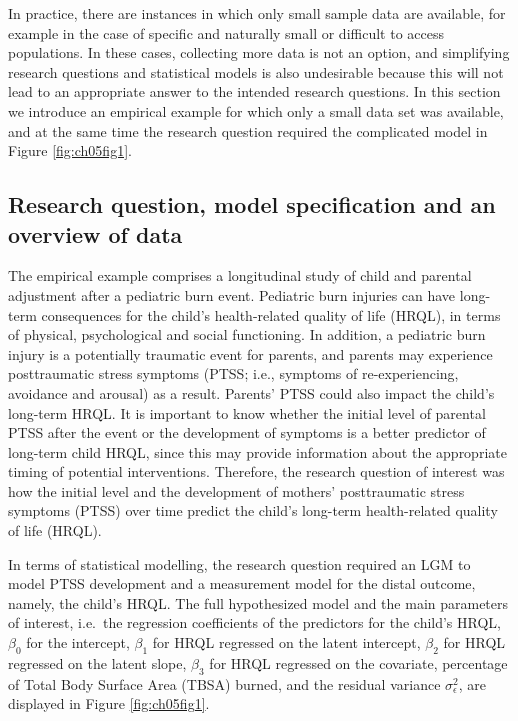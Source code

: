 \documentclass[openright,titlepage,12pt,a4paper]{book}
\begin{document}
In practice, there are instances in which only small sample data are available, for example in the case of specific and naturally small or difficult to access populations. In these cases, collecting more data is not an option, and simplifying research questions and statistical models is also undesirable because this will not lead to an appropriate answer to the intended research questions. In this section we introduce an empirical example for which only a small data set was available, and at the same time the research question required the complicated model in Figure \ref{fig:ch05fig1}.

\hypertarget{research-question-model-specification-and-an-overview-of-data}{%
\subsection{Research question, model specification and an overview of data}\label{research-question-model-specification-and-an-overview-of-data}}

The empirical example comprises a longitudinal study of child and parental adjustment after a pediatric burn event. Pediatric burn injuries can have long-term consequences for the child's health-related quality of life (HRQL), in terms of physical, psychological and social functioning. In addition, a pediatric burn injury is a potentially traumatic event for parents, and parents may experience posttraumatic stress symptoms (PTSS; i.e., symptoms of re-experiencing, avoidance and arousal) as a result. Parents' PTSS could also impact the child's long-term HRQL. It is important to know whether the initial level of parental PTSS after the event or the development of symptoms is a better predictor of long-term child HRQL, since this may provide information about the appropriate timing of potential interventions. Therefore, the research question of interest was how the initial level and the development of mothers' posttraumatic stress symptoms (PTSS) over time predict the child's long-term health-related quality of life (HRQL).

In terms of statistical modelling, the research question required an LGM to model PTSS development and a measurement model for the distal outcome, namely, the child's HRQL. The full hypothesized model and the main parameters of interest, i.e.~the regression coefficients of the predictors for the child's HRQL, \(\beta_0\) for the intercept, \(\beta_1\) for HRQL regressed on the latent intercept, \(\beta_2\) for HRQL regressed on the latent slope, \(\beta_3\) for HRQL regressed on the covariate, percentage of Total Body Surface Area (TBSA) burned, and the residual variance \(\sigma_\epsilon^2\), are displayed in Figure \ref{fig:ch05fig1}.
\end{document}
